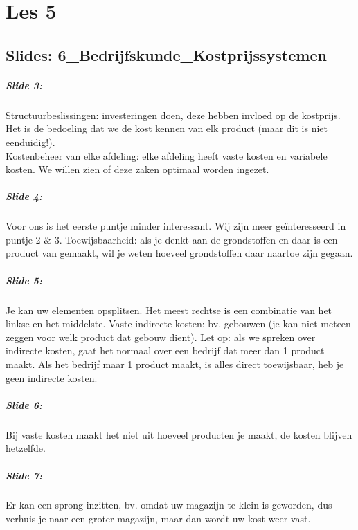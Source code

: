 \documentclass[10pt,a4paper]{report}
\begin{document}
\chapter{Les 5}

\section{Slides: 6\_Bedrijfskunde\_Kostprijssystemen}

\paragraph{Slide 3:} Structuurbeslissingen: investeringen doen, deze hebben invloed op de kostprijs. Het is de bedoeling dat we de kost kennen van elk product (maar dit is niet eenduidig!).\\
Kostenbeheer van elke afdeling: elke afdeling heeft vaste kosten en variabele kosten. We willen zien of deze zaken optimaal worden ingezet.

\paragraph{Slide 4:} Voor ons is het eerste puntje minder interessant. Wij zijn meer ge\"interesseerd in puntje 2 $\&$ 3. Toewijsbaarheid: als je denkt aan de grondstoffen en daar is een product van gemaakt, wil je weten hoeveel grondstoffen daar naartoe zijn gegaan.

\paragraph{Slide 5:} Je kan uw elementen opsplitsen. Het meest rechtse is een combinatie van het linkse en het middelste. Vaste indirecte kosten: bv. gebouwen (je kan niet meteen zeggen voor welk product dat gebouw dient). Let op: als we spreken over indirecte kosten, gaat het normaal over een bedrijf dat meer dan 1 product maakt. Als het bedrijf maar 1 product maakt, is alles direct toewijsbaar, heb je geen indirecte kosten.

\paragraph{Slide 6:} Bij vaste kosten maakt het niet uit hoeveel producten je maakt, de kosten blijven hetzelfde.

\paragraph{Slide 7:} Er kan een sprong inzitten, bv. omdat uw magazijn te klein is geworden, dus verhuis je naar een groter magazijn, maar dan wordt uw kost weer vast.
\end{document}
